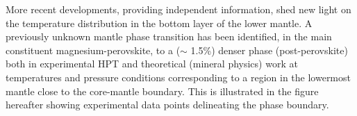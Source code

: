 \vspace{.5cm}


\vspace{.5cm}

More recent developments, providing independent information, shed new light 
on the temperature distribution in the bottom layer of the lower mantle.
A previously unknown mantle phase transition has been identified,
in the main constituent magnesium-perovskite, to a 
($\sim$ 1.5\%) denser phase
(post-perovskite) both in experimental HPT and theoretical 
(mineral physics) work at temperatures and pressure conditions
corresponding to a region in the lowermost mantle close to the 
core-mantle boundary.
This is illustrated in the figure hereafter 
showing experimental data points delineating the phase boundary.

